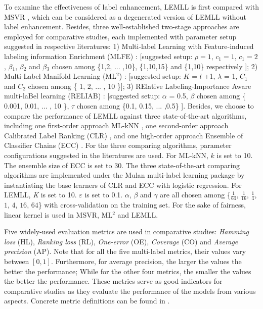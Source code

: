 \documentclass[conference]{IEEEtran}
\begin{document}
To examine the effectiveness of label enhancement, LEMLL is first compared with MSVR \cite{tuia2011multioutput}, which can be considered as a degenerated version of LEMLL without label enhancement. Besides, three well-established two-stage approaches are employed for comparative studies, each implemented with parameter setup suggested in respective literatures: 1) Multi-label Learning with Feature-induced labeling information Enrichment (MLFE) \cite{zhang2018feature}: [suggested setup: $\rho=1$, $c_1=1$, $c_1=2$, $\beta$$_1$, $\beta$$_2$ and $\beta$$_3$ chosen among \{1,2, ... ,10\}, \{1,10,15\} and \{1,10\} respectively ]; 2) Multi-Label Manifold Learning (ML$^2$) \cite{hou2016multi}: [suggested setup: $K$ = $l$ +1, $\lambda$ = 1, $C_{1}$ and $C_{2}$ chosen among \{ 1, 2, ... , 10 \}]; 3) RElative Labeling-Importance Aware multi-laBel learning (RELIAB) \cite{li2015leveraging}: [suggested setup: $\alpha$ = 0.5, $\beta$ chosen among \{ 0.001, 0.01, ... , 10 \}, $\tau$ chosen among \{0.1, 0.15, ... ,0.5\} ]. Besides, we choose to compare the performance of LEMLL against three state-of-the-art algorithms, including one first-order approach ML-kNN \cite{zhang2007ml}, one second-order approach Calibrated Label Ranking (CLR) \cite{furnkranz2008multilabel}, and one high-order approach Ensemble of Classifier Chains (ECC) \cite{read2011classifier}. For the three comparing algorithms, parameter configurations suggested in the literatures are used. For ML-kNN, $k$ is set to 10. The ensemble size of ECC is set to 30. The three state-of-the-art comparing algorithms are implemented under the Mulan multi-label learning package \cite{tsoumakas2011mulan} by instantiating the base learners of CLR and ECC with logistic regression. For LEMLL, \emph{K} is set to 10. $\varepsilon$ is set to 0.1. $\alpha$, $\beta$ and $\gamma$ are all chosen among \{$\frac{1}{64}$, $\frac{1}{16}$, $\frac{1}{4}$, $1$, $4$, $16$, $64$\} with cross-validation on the training set. For the sake of fairness, linear kernel is used in MSVR, ML$^2$ and LEMLL.

Five widely-used evaluation metrics are used in comparative studies: \emph{Hamming loss} (HL), \emph{Ranking loss} (RL), \emph{One-error} (OE), \emph{Coverage} (CO) and \emph{Average precision} (AP). Note that for all the five multi-label metrics, their values vary between $[ 0, 1 ]$. Furthermore, for average precision, the larger the values the better the performance; While for the other four metrics, the smaller the values the better the performance. These metrics serve as good indicators for comparative studies as they evaluate the performance of the models from various aspects. Concrete metric definitions can be found in \cite{zhang2014review}.
\end{document}
